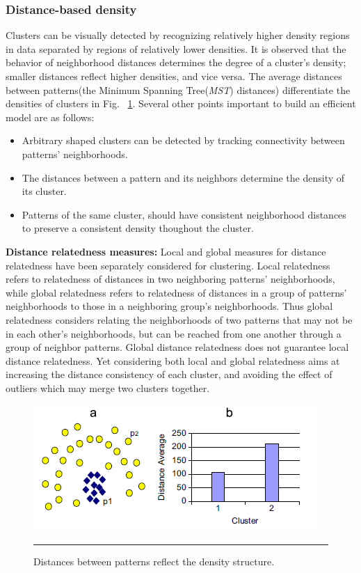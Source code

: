 \subsubsection{Distance-based density}\label{subsec:dist_density} 
Clusters can be visually detected by recognizing relatively higher density regions in data separated by regions of relatively lower densities. It is observed that the behavior of neighborhood distances determines the degree of a cluster's density; smaller distances reflect higher densities, and vice versa. The average distances between patterns(the Minimum
Spanning Tree(\textit{MST}) distances) differentiate the densities of clusters in Fig. ~\ref{fig:mitosis_1}. Several other points important to build an efficient model are as follows:
\begin{itemize}
\item Arbitrary shaped clusters can be detected by tracking connectivity between patterns' neighborhoods.
\item The distances between a pattern and its neighbors determine the density of its cluster.
\item Patterns of the same cluster, should have consistent neighborhood distances to preserve a consistent density thoughout the cluster.
\end{itemize}
\textbf{Distance relatedness measures:} Local and global measures for distance relatedness have been separately considered for clustering. Local relatedness refers to relatedness of distances in two neighboring patterns' neighborhoods, while global relatedness refers to relatedness of distances in a group of patterns' neighborhoods to those in a neighboring group's neighborhoods. Thus global relatedness considers relating the neighborhoods of two patterns that may not be in each other's neighborhoods, but can be reached from one another through a group of neighbor patterns. Global distance relatedness does not guarantee local distance relatedness. Yet considering both local and global relatedness aims at increasing the distance consistency of each cluster, and avoiding the effect of outliers which may merge two clusters together.

\begin{figure}[htbp]
	\centering
		\includegraphics{./Figures/Mitosis_1.png}
		\rule{35em}{0.5pt}
	\caption[Distances between patterns reflect the density structure.]{Distances between patterns reflect the density structure.}
	\label{fig:mitosis_1}
\end{figure}

